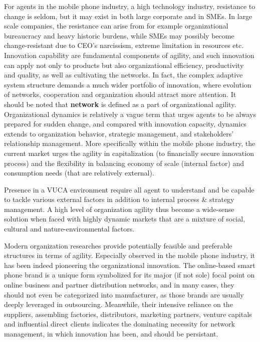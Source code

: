 \documentclass[utf8,english]{gradu3}
\begin{document}
For agents in the mobile phone industry, a high technology industry, resistance to change is seldom, but it may exist in both large corporate and in SMEs. In large scale companies, the resistance can arise from for example organizational bureaucracy and heavy historic burdens, while SMEs may possibly become change-resistant due to CEO's narcissism, extreme limitation in resources etc. Innovation capability are fundamental components of agility, and such innovation can apply not only to products but also organizational efficiency, productivity and quality, as well as cultivating the networks. In fact, the complex adaptive system structure demands a much wider portfolio of innovation, where evolution of networks, cooperation and organization should attract more attention. It should be noted that \textbf{network} is defined as a part of organizational agility. Organizational dynamics is relatively a vague term that urges agents to be always prepared for sudden change, and compared with innovation capacity, dynamics extends to organization behavior, strategic management, and stakeholders’ relationship management. More specifically within the mobile phone industry, the current market urges the agility in capitalization (to financially secure innovation process) and the flexibility in balancing economy of scale (internal factor) and consumption needs (that are relatively external).

Presence in a VUCA environment require all agent to understand and be capable to tackle various external factors in addition to internal process \& strategy management. A high level of organization agility thus become a wide-sense solution when faced with highly dynamic markets that are a mixture of social, cultural and nature-environmental factors.

Modern organization researches provide potentially feasible and preferable structures in terms of agility. Especially observed in the mobile phone industry, it has been indeed pioneering the organizational innovation. The online-based smart phone brand is a unique form symbolized for its major (if not sole) focal point on online business and partner distribution networks, and in many cases, they should not even be categorized into manufacturer, as those brands are usually deeply leveraged in outsourcing. Meanwhile, their intensive reliance on the suppliers, assembling factories, distributors, marketing partners, venture capitals and influential direct clients indicates the dominating necessity for network management, in which innovation has been, and should be persistant.
\end{document}
